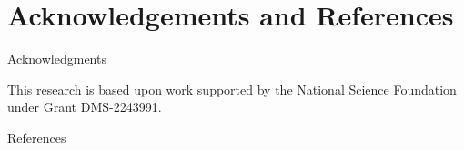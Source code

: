 \documentclass{reu_beamer}
\begin{document}
\section{Acknowledgements and References}
    \begin{frame}{Acknowledgments}
    \centering
    
    This research is based upon work supported by the National Science Foundation under Grant DMS-2243991.\newline
    
\end{frame}
%
\begin{frame}[allowframebreaks]{References}
\nocite{*}

{\small}
\end{frame}

\end{document}
